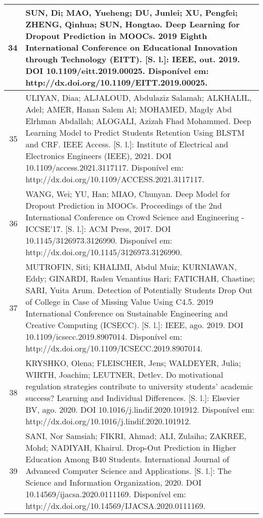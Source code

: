 \begin{apendicesenv}
\begin{longtable}[c]{|r|l|}
34 &
  \multicolumn{1}{p{14.5cm}|}{SUN, Di; MAO, Yueheng; DU, Junlei; XU, Pengfei; ZHENG, Qinhua; SUN, Hongtao. Deep Learning for Dropout Prediction in MOOCs. 2019 Eighth International Conference on Educational Innovation through Technology (EITT). {[}S. l.{]}: IEEE, out. 2019. DOI 10.1109/eitt.2019.00025. Disponível em: http://dx.doi.org/10.1109/EITT.2019.00025.} \\ \hline
35 &
  \multicolumn{1}{p{14.5cm}|}{ULIYAN, Diaa; ALJALOUD, Abdulaziz Salamah; ALKHALIL, Adel; AMER, Hanan Salem Al; MOHAMED, Magdy Abd Elrhman Abdallah; ALOGALI, Azizah Fhad Mohammed. Deep Learning Model to Predict Students Retention Using BLSTM and CRF. IEEE Access. {[}S. l.{]}: Institute of Electrical and Electronics Engineers (IEEE), 2021. DOI 10.1109/access.2021.3117117. Disponível em: http://dx.doi.org/10.1109/ACCESS.2021.3117117.} \\ \hline
36 &
  \multicolumn{1}{p{14.5cm}|}{WANG, Wei; YU, Han; MIAO, Chunyan. Deep Model for Dropout Prediction in MOOCs. Proceedings of the 2nd International Conference on Crowd Science and Engineering - ICCSE’17. {[}S. l.{]}: ACM Press, 2017. DOI 10.1145/3126973.3126990. Disponível em: http://dx.doi.org/10.1145/3126973.3126990.} \\ \hline
37 &
  \multicolumn{1}{p{14.5cm}|}{MUTROFIN, Siti; KHALIMI, Abdul Muiz; KURNIAWAN, Eddy; GINARDI, Raden Venantius Hari; FATICHAH, Chastine; SARI, Yuita Arum. Detection of Potentially Students Drop Out of College in Case of Missing Value Using C4.5. 2019 International Conference on Sustainable Engineering and Creative Computing (ICSECC). {[}S. l.{]}: IEEE, ago. 2019. DOI 10.1109/icsecc.2019.8907014. Disponível em: http://dx.doi.org/10.1109/ICSECC.2019.8907014.} \\ \hline
38 &
  \multicolumn{1}{p{14.5cm}|}{KRYSHKO, Olena; FLEISCHER, Jens; WALDEYER, Julia; WIRTH, Joachim; LEUTNER, Detlev. Do motivational regulation strategies contribute to university students’ academic success? Learning and Individual Differences. {[}S. l.{]}: Elsevier BV, ago. 2020. DOI 10.1016/j.lindif.2020.101912. Disponível em: http://dx.doi.org/10.1016/j.lindif.2020.101912.} \\ \hline
39 &
  \multicolumn{1}{p{14.5cm}|}{SANI, Nor Samsiah; FIKRI, Ahmad; ALI, Zulaiha; ZAKREE, Mohd; NADIYAH, Khairul. Drop-Out Prediction in Higher Education Among B40 Students. International Journal of Advanced Computer Science and Applications. {[}S. l.{]}: The Science and Information Organization, 2020. DOI 10.14569/ijacsa.2020.0111169. Disponível em: http://dx.doi.org/10.14569/IJACSA.2020.0111169.} \\ \hline

\end{longtable}
\end{apendicesenv}
